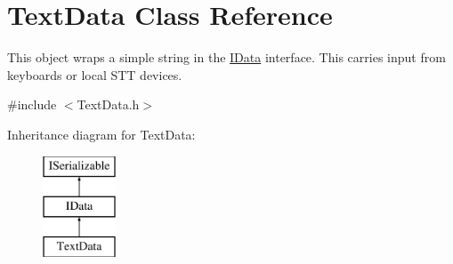 \hypertarget{class_text_data}{}\section{Text\+Data Class Reference}
\label{class_text_data}


This object wraps a simple string in the \hyperlink{class_i_data}{I\+Data} interface. This carries input from keyboards or local S\+TT devices.  




{\ttfamily \#include $<$Text\+Data.\+h$>$}

Inheritance diagram for Text\+Data\+:\begin{figure}[H]
\begin{center}
\leavevmode
\includegraphics[height=3.000000cm]{class_text_data}
\end{center}
\end{figure}
